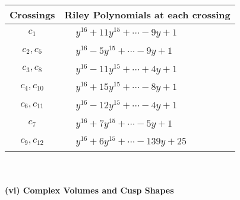 \documentclass[1p]{elsarticle_modified}
\theoremstyle{definition}
\begin{document}
\begin{tabular}{m{50pt}|m{274pt}}
Crossings & \hspace{64pt}Riley Polynomials at each crossing \\
\hline $$\begin{aligned}c_{1}\end{aligned}$$&$\begin{aligned}
&y^{16}+11 y^{15}+\cdots-9 y+1
\end{aligned}$\\
\hline $$\begin{aligned}c_{2},c_{5}\end{aligned}$$&$\begin{aligned}
&y^{16}-5 y^{15}+\cdots-9 y+1
\end{aligned}$\\
\hline $$\begin{aligned}c_{3},c_{8}\end{aligned}$$&$\begin{aligned}
&y^{16}-11 y^{15}+\cdots+4 y+1
\end{aligned}$\\
\hline $$\begin{aligned}c_{4},c_{10}\end{aligned}$$&$\begin{aligned}
&y^{16}+15 y^{15}+\cdots-8 y+1
\end{aligned}$\\
\hline $$\begin{aligned}c_{6},c_{11}\end{aligned}$$&$\begin{aligned}
&y^{16}-12 y^{15}+\cdots-4 y+1
\end{aligned}$\\
\hline $$\begin{aligned}c_{7}\end{aligned}$$&$\begin{aligned}
&y^{16}+7 y^{15}+\cdots-5 y+1
\end{aligned}$\\
\hline $$\begin{aligned}c_{9},c_{12}\end{aligned}$$&$\begin{aligned}
&y^{16}+6 y^{15}+\cdots-139 y+25
\end{aligned}$\\
\hline
\end{tabular}\\~\\
\newpage\flushleft \textbf{(vi) Complex Volumes and Cusp Shapes}
\end{document}
